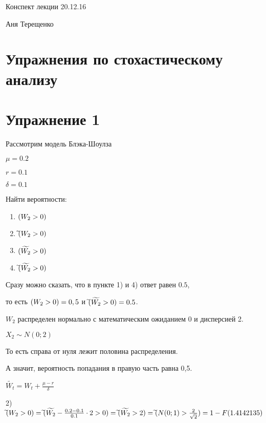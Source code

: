 \documentclass[a4paper]{article}
\let\P\relax
\DeclareMathOperator{\P}{P}
\begin{document}
 \begin{center}
 {\Large{Конспект лекции 20.12.16}}
 \end{center}
  \begin{center}
 {\large{Аня Терещенко}}
 \end{center}

\section*{Упражнения по стохастическому анализу}

\section*{Упражнение 1}

\parindent=1cm

Рассмотрим модель Блэка-Шоулза

$\mu=0.2$

$r=0.1$

$\delta=0.1$

Найти вероятности:

\begin{enumerate}

\item $\P(W_2>0)$

\item $\widetilde{\P}(W_2>0)$

\item $\P(\widetilde{W_2}>0)$

\item $\widetilde{\P}(\widetilde{W_2}>0)$
\end{enumerate}

Сразу можно сказать, что в пункте 1) и 4) ответ равен $0.5$,

то есть $\P(W_2>0)=0,5$ и  $\widetilde{\P}(\widetilde{W_2}>0)=0.5$.

$W_2$ распределен нормально с математическим ожиданием 0 и дисперсией 2.

$X_2 \sim N(0;2)$

То есть справа от нуля лежит половина распределения.

А значит, вероятность попадания в правую часть равна 0,5.

$\widetilde{W_t}=W_t+\frac{\mu -r}{\delta}$

2) $\widetilde{\P}(W_2>0)=\widetilde{\P}(\widetilde{W_2}-\frac{0.2-0.1}{0.1}\cdot 2 >0)=\widetilde{\P}(\widetilde{W_2}>2)=\widetilde{\P}(N(0;1)>\frac{2}{\sqrt{2}})=1-F(1.4142135)$
\end{document}
